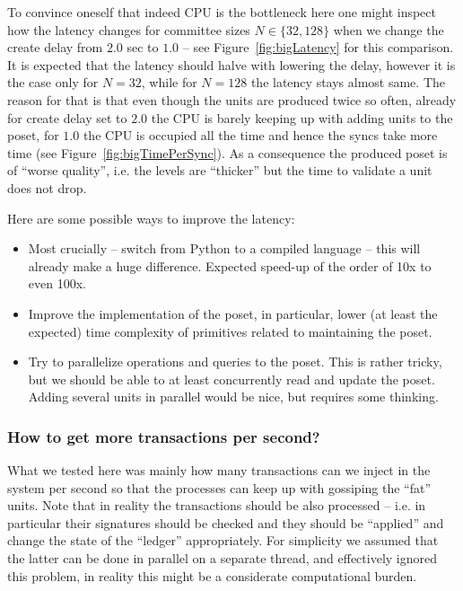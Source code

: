 \documentclass[a4paper,10pt]{article}
\begin{document}
				To convince oneself that indeed CPU is the bottleneck here one might inspect how the latency changes for committee sizes $N \in \{32, 128\}$
				when we change the create delay from $2.0$ sec to $1.0$ -- see Figure~\ref{fig:bigLatency} for this comparison.
				It is expected that the latency should halve with lowering the delay, however it is the case only for $N=32$, while for $N=128$ the latency stays almost same.
				The reason for that is that even though the units are produced twice so often, already for create delay set to $2.0$ the CPU is barely keeping up with adding units to the poset, for $1.0$ the CPU is occupied all the time and hence the syncs take more time (see Figure~\ref{fig:bigTimePerSync}). As a consequence the produced poset is of ``worse quality'', i.e. the levels are ``thicker'' but the time to validate a unit does not drop.

				Here are some possible ways to improve the latency:
				\begin{itemize}
					\item Most crucially -- switch from Python to a compiled language -- this will already make a huge difference. Expected speed-up of the order of 10x to even 100x.
					\item Improve the implementation of the poset, in particular, lower (at least the expected) time complexity of primitives related to
					maintaining the poset.
					\item Try to parallelize operations and queries to the poset. This is rather tricky, but we should be able to at least concurrently read and update the poset. Adding several units in parallel would be nice, but requires some thinking.
				\end{itemize}

			\subsubsection*{How to get more transactions per second?}
				What we tested here was mainly how many transactions can we inject in the system per second so that the processes can keep up with gossiping the ``fat'' units.
				Note that in reality the transactions should be also processed -- i.e. in particular their signatures should be checked and they should be ``applied'' and change the state of the ``ledger'' appropriately.
				For simplicity we assumed that the latter can be done in parallel on a separate thread, and effectively ignored this problem, in reality this might be a considerate computational burden.
\end{document}
